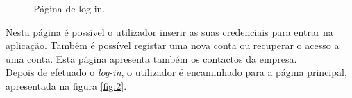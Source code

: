 \begin{figure}[ht!]
\centering
{}
\caption{Página de log-in.}
\label{fig:1}
\end{figure}

Nesta página é possível o utilizador inserir as suas credenciais para entrar na aplicação. Também é possível registar uma nova conta ou recuperar o acesso a uma conta. Esta página apresenta também os contactos da empresa.\\
Depois de efetuado o \textit{log-in}, o utilizador é encaminhado para a página principal, apresentada na figura \ref{fig:2}.

